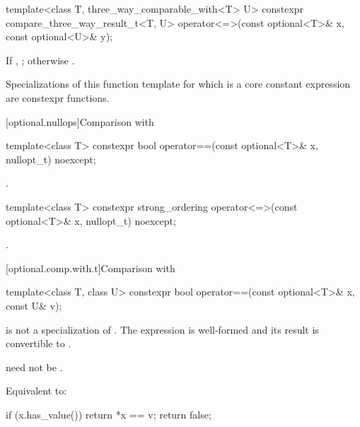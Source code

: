 %
\begin{itemdecl}
template<class T, three_way_comparable_with<T> U>
  constexpr compare_three_way_result_t<T, U> operator<=>(const optional<T>& x, const optional<U>& y);
\end{itemdecl}

\begin{itemdescr}
\pnum
\returns
If , ; otherwise .

\pnum
\remarks
Specializations of this function template for which  is a core constant expression are constexpr functions.
\end{itemdescr}

[optional.nullops]{Comparison with }

%
\begin{itemdecl}
template<class T>
  constexpr bool operator==(const optional<T>& x, nullopt_t) noexcept;
\end{itemdecl}

\begin{itemdescr}
\pnum
\returns
{}.
\end{itemdescr}

%
\begin{itemdecl}
template<class T>
  constexpr strong_ordering operator<=>(const optional<T>& x, nullopt_t) noexcept;
\end{itemdecl}

\begin{itemdescr}
\pnum
\returns
{}.
\end{itemdescr}

[optional.comp.with.t]{Comparison with }

%
\begin{itemdecl}
template<class T, class U>
  constexpr bool operator==(const optional<T>& x, const U& v);
\end{itemdecl}

\begin{itemdescr}
\pnum
\constraints
{} is not a specialization of . The expression  is well-formed and its result is convertible to .
\begin{note}
 need not be .
\end{note}

\pnum
\effects
Equivalent to:
\begin{codeblock}
if (x.has_value())
  return *x == v;
return false;
\end{codeblock}
\end{itemdescr}


